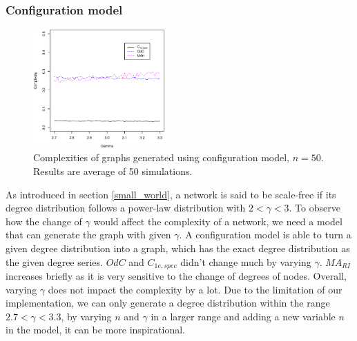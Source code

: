 \documentclass[12pt]{article}
\begin{document}
\subsubsection{Configuration model}
\label{configuration_model}
\begin{figure}[!h]
    \centering
    \includegraphics[width=0.45\textwidth]{configuration_model.eps}
    \caption{Complexities of graphs generated using configuration model, $n=50$. Results are average of 50 simulations.}
    \label{fig:configuration_model}
\end{figure}
\par
As introduced in section \ref{small_world}, a network is said to be scale-free if its degree distribution follows a power-law distribution with $2<\gamma <3$. To observe how the change of $\gamma$ would affect the complexity of a network, we need a model that can generate the graph with given $\gamma$. A configuration model \cite{newmanbook} is able to turn a given degree distribution into a graph, which has the exact degree distribution as the given degree series. 
$OdC$ and $C_{1e,spec}$ didn't change much by varying $\gamma$. $MA_{RI}$ increases briefly as it is very sensitive to the change of degrees of nodes. Overall, varying $\gamma$ does not impact the complexity by a lot. Due to the limitation of our implementation, we can only generate a degree distribution within the range $2.7<\gamma<3.3$, by varying $n$ and $\gamma$ in a larger range and adding a new variable $n$ in the model, it can be more inspirational. 
\end{document}
